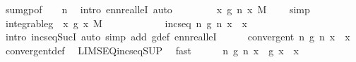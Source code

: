 \begin{isabellebody}
\ sum{\isacharunderscore}{\kern0pt}gp{}{\isacharbrackleft}{\kern0pt}of\ {\isachardoublequoteopen}{}\ {\isacharslash}{\kern0pt}\ {}{\isachardoublequoteclose}\ n{\isacharbrackright}{\kern0pt}\ \isamarkupfalse%
\ {\isacharparenleft}{\kern0pt}intro\ ennreal{\isacharunderscore}{\kern0pt}leI{\isacharcomma}{\kern0pt}\ auto{\isacharparenright}{\kern0pt}\isanewline
\ \ \ \ \isamarkupfalse%
\ \isamarkupfalse%
\ {\isachardoublequoteopen}{\isacharparenleft}{\kern0pt}{\isasymintegral}\isactrlsup {\isacharplus}{\kern0pt}\ x{\isachardot}{\kern0pt}\ g\ n\ x\ {\isasympartial}M{\isacharparenright}{\kern0pt}\ {\isacharless}{\kern0pt}\ {}{\isachardoublequoteclose}\ \isamarkupfalse%
\ simp\isanewline
\ \ \isamarkupfalse%
\isanewline
\isanewline
\ \ \isamarkupfalse%
\ integrable{\isacharunderscore}{\kern0pt}g{\isacharprime}{\kern0pt}{\isacharcolon}{\kern0pt}\ {\isachardoublequoteopen}{\isacharparenleft}{\kern0pt}{\isasymintegral}\isactrlsup {\isacharplus}{\kern0pt}\ x{\isachardot}{\kern0pt}\ g{\isacharprime}{\kern0pt}\ x\ {\isasympartial}M{\isacharparenright}{\kern0pt}\ {\isasymle}\ {}{\isachardoublequoteclose}\isanewline
\ \ \isamarkupfalse%
\ {\isacharminus}{\kern0pt}\isanewline
\ \ \ \ \isamarkupfalse%
\ {\isachardoublequoteopen}incseq\ {\isacharparenleft}{\kern0pt}{\isasymlambda}n{\isachardot}{\kern0pt}\ g\ n\ x{\isacharparenright}{\kern0pt}{\isachardoublequoteclose}\ \ x\ \isamarkupfalse%
\ {\isacharparenleft}{\kern0pt}intro\ incseq{\isacharunderscore}{\kern0pt}SucI{\isacharcomma}{\kern0pt}\ auto\ simp\ add{\isacharcolon}{\kern0pt}\ g{\isacharunderscore}{\kern0pt}def\ ennreal{\isacharunderscore}{\kern0pt}leI{\isacharparenright}{\kern0pt}\isanewline
\ \ \ \ \isamarkupfalse%
\ {\isachardoublequoteopen}convergent\ {\isacharparenleft}{\kern0pt}{\isasymlambda}n{\isachardot}{\kern0pt}\ g\ n\ x{\isacharparenright}{\kern0pt}{\isachardoublequoteclose}\ \ x\ \isamarkupfalse%
\ convergent{\isacharunderscore}{\kern0pt}def\ \isamarkupfalse%
\ LIMSEQ{\isacharunderscore}{\kern0pt}incseq{\isacharunderscore}{\kern0pt}SUP\ \isamarkupfalse%
\ fast\isanewline
\ \ \ \ \isamarkupfalse%
\ {\isachardoublequoteopen}{\isacharparenleft}{\kern0pt}{\isasymlambda}n{\isachardot}{\kern0pt}\ g\ n\ x{\isacharparenright}{\kern0pt}\ {\isasymlonglonglongrightarrow}\ g{\isacharprime}{\kern0pt}\ x{\isachardoublequoteclose}\ \ x\ \isamarkupfalse%

\end{isabellebody}
